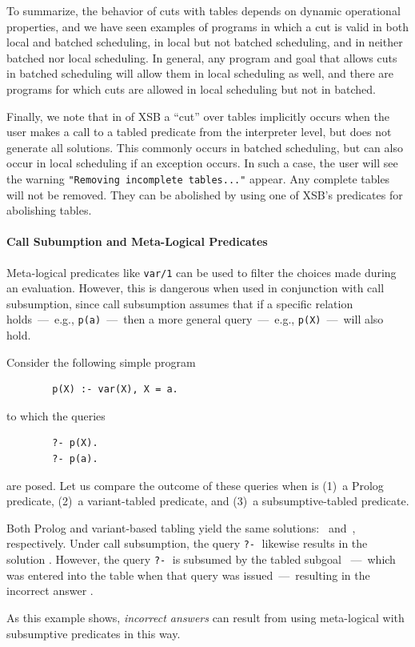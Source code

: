 To summarize, the behavior of cuts with tables depends on dynamic
operational properties, and we have seen examples of programs in which
a cut is valid in both local and batched scheduling, in local but not
batched scheduling, and in neither batched nor local scheduling.  In
general, any program and goal that allows cuts in batched scheduling
will allow them in local scheduling as well, and there are programs
for which cuts are allowed in local scheduling but not in batched.

Finally, we note that in \version{} of XSB a ``cut'' over tables
implicitly occurs when the user makes a call to a tabled predicate
from the interpreter level, but does not generate all solutions.  This
commonly occurs in batched scheduling, but can also occur in local
scheduling if an exception occurs.  In such a case, the user will see
the warning {\tt "Removing incomplete tables..."} appear.  Any
complete tables will not be removed.  They can be abolished by using
one of XSB's predicates for abolishing tables.

\paragraph{Call Subumption and Meta-Logical Predicates}

Meta-logical predicates like {\tt var/1} can be used to filter the
choices made during an evaluation.  However, this is dangerous when
used in conjunction with call subsumption, since call subsumption
assumes that if a specific relation holds~---~e.g.,
\texttt{p(a)}~---~then a more general query~---~e.g.,
\texttt{p(X)}~---~will also hold.

\begin{example}\label{example:sub-fail}
Consider the following simple program
\begin{verbatim}
        p(X) :- var(X), X = a.
\end{verbatim}
to which the queries
\begin{verbatim}
        ?- p(X).
        ?- p(a).
\end{verbatim}
are posed.  Let us compare the outcome of these queries when
 is (1)~a Prolog predicate, (2)~a variant-tabled predicate,
and (3)~a subsumptive-tabled predicate.

Both Prolog and variant-based tabling yield the same solutions:
\, and\, , respectively.  Under call subsumption,
the query \verb|?-|$\;$ likewise results in the solution
.  However, the query \verb|?-|$\;$  is
subsumed by the tabled subgoal ~---~which was entered into
the table when that query was issued~---~resulting in the incorrect
answer .\fillBox
\end{example}
%
As this example shows, \emph{incorrect answers} can result from using
meta-logical with subsumptive predicates in this way.

